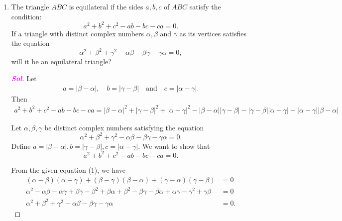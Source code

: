 \documentclass{article}
\theoremstyle{definition}
\newcommand{\abs}[1]{\left\lvert #1 \right\rvert}
\newcommand{\sol}{\textcolor{magenta}{\bf Sol}}
\begin{document}
\begin{enumerate}
\begin{proof}[\sol]
\begin{enumerate}
			$\frac{\partial u}{\partial x}(0, 0) = 0 = \frac{\partial v}{\partial y}(0, 0)$
			$\frac{\partial u}{\partial y}(0, 0) = 0 = -\frac{\partial v}{\partial x}(0, 0)$
			As the Cauchy-Riemann equations hold at $z = 0$, we can conclude that the function $f(z)$ is complex differentiable at $z = 0$.
		\end{enumerate}
	\end{proof}
	
	\item The triangle $ABC$ is equilateral if the sides $a, b, c$ of $ABC$ satisfy the condition: \[
	a^2 + b^2 + c^2 - ab - bc - ca = 0.
	\]
	If a triangle with distinct complex numbers $\alpha,\beta$ and $\gamma$ as its vertices satisfies the equation \[
	\alpha^2+\beta^2+\gamma^2-\alpha\beta-\beta\gamma-\gamma\alpha=0,
	\] will it be an equilateral triangle?
	\begin{proof}[\sol]
		Let \begin{align*}
			a = \abs{\beta - \alpha},\quad b = \abs{\gamma - \beta}\quad\text{and}\quad c = \abs{\alpha - \gamma}.
		\end{align*} Then 
		\begin{align*}
			a^2 + b^2 + c^2 - ab - bc - ca=\abs{\beta - \alpha}^2 + \abs{\gamma - \beta}^2 + \abs{\alpha - \gamma}^2 - \abs{\beta - \alpha}\abs{\gamma - \beta} - \abs{\gamma - \beta}\abs{\alpha - \gamma} - \abs{\alpha - \gamma}\abs{\beta - \alpha}
		\end{align*}
	
		\newpage
		Let $\alpha, \beta, \gamma$ be distinct complex numbers satisfying the equation
		\begin{equation}
			\alpha^2 + \beta^2 + \gamma^2 - \alpha\beta - \beta\gamma - \gamma\alpha = 0.
		\end{equation}
		Define $a = |\beta - \alpha|, b = |\gamma - \beta|, c = |\alpha - \gamma|$. We want to show that
		\begin{equation}
			a^2 + b^2 + c^2 - ab - bc - ca = 0.
		\end{equation}
		
		From the given equation (1), we have
		\begin{align*}
			(\alpha - \beta)(\alpha - \gamma) + (\beta - \gamma)(\beta - \alpha) + (\gamma - \alpha)(\gamma - \beta) &= 0 \\
			\alpha^2 - \alpha\beta - \alpha\gamma + \beta\gamma - \beta^2 + \beta\alpha + \beta^2 - \beta\gamma - \beta\alpha + \alpha\gamma - \gamma^2 + \gamma\beta &= 0 \\
			\alpha^2 + \beta^2 + \gamma^2 - \alpha\beta - \beta\gamma - \gamma\alpha &= 0.
		\end{align*}
		

\end{proof}
\end{enumerate}
\end{document}
